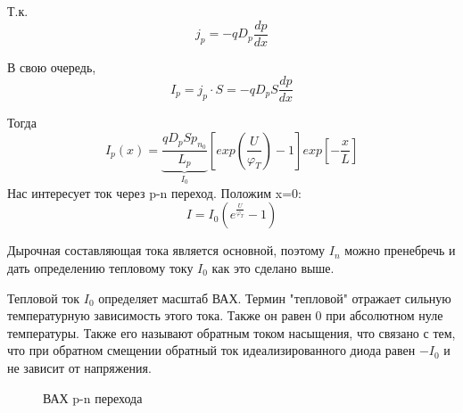 Т.к.
$$
j_p = -qD_p\frac{dp}{dx}
$$

В свою очередь, 
$$
I_p = j_p \cdot S = -qD_pS\frac{dp}{dx} 
$$

Тогда 
$$
I_p(x) = \underbrace{\frac{qD_pSp_{n_0}}{L_p}}_{I_0}\left[exp\left(\frac{U}{\varphi_T}\right) -1 \right] exp\left[-\frac{x}{L}\right]
$$
Нас интересует ток через p-n переход. Положим x=0:
\begin{equation}
I = I_0\left(e^{\frac{U}{\varphi_T}} -1 \right)
\end{equation}

Дырочная составляющая тока является основной, поэтому $I_n$ можно пренебречь и дать определению тепловому току $I_0$ как это сделано выше.

Тепловой ток $I_0$ определяет масштаб ВАХ. Термин "тепловой" отражает сильную температурную зависимость этого тока. Также он равен 0 при абсолютном нуле температуры. Также его называют обратным током насыщения, что связано с тем, что при обратном смещении обратный ток идеализированного диода равен $-I_0$ и не зависит от напряжения.

\begin{center}
	\begin{figure}[h!]
		\caption{ВАХ p-n перехода}
	\end{figure}
\end{center}


